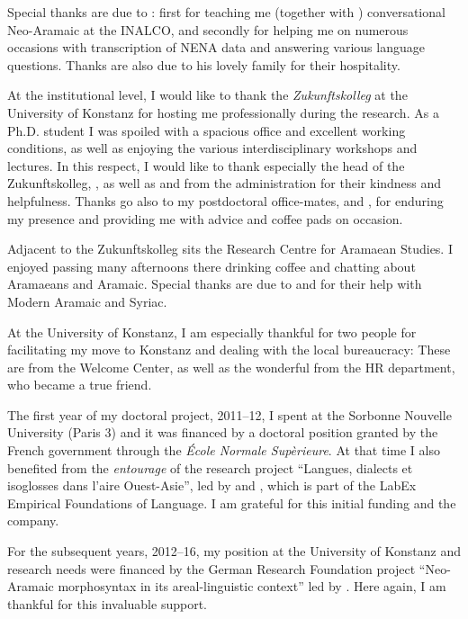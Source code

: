 Special thanks are due to : first for teaching me (together with ) conversational Neo-Aramaic at the INALCO, and secondly for helping me on numerous occasions with transcription of NENA data and answering various language questions. Thanks are also due to his lovely family for their hospitality.

At the institutional level, I would like to thank the \textit{Zukunftskolleg} at the University of Konstanz for hosting me professionally during the research. As a Ph.D. student I was spoiled with a spacious office and excellent working conditions, as well as enjoying the various interdisciplinary workshops and lectures. In this respect, I would like to thank especially the head of the Zukunftskolleg, , as well as  and  from the administration for their kindness and helpfulness. Thanks go also to my postdoctoral office-mates,  and , for enduring my presence and providing me with advice and coffee pads on occasion.

Adjacent to the Zukunftskolleg sits the Research Centre for Aramaean Studies. I enjoyed passing many afternoons there drinking coffee and chatting about Aramaeans and Aramaic. Special thanks are due to  and  for their help with Modern Aramaic and Syriac. 

At the University of Konstanz, I am especially thankful for two people for facilitating my move to Konstanz and dealing with the local bureaucracy: These are  from the Welcome Center, as well as the wonderful  from the HR department, who became a true friend.   

The first year of my doctoral project, 2011--12, I spent at the Sorbonne Nouvelle University (Paris 3) and it was financed by a doctoral position granted by the French government through the \textit{École Normale Supèrieure}. At that time I also benefited from the \textit{entourage} of the research project \enquote{Langues, dialects et isoglosses dans l'aire Ouest-Asie}, led by  and , which is part of the LabEx Empirical Foundations of Language. I am grateful for this initial funding and the company.

For the subsequent years, 2012--16, my position at the University of Konstanz and research needs were financed by the German Research Foundation project \enquote{Neo-Aramaic morphosyntax in its areal-linguistic context} led by . Here again, I am thankful for this invaluable support.

